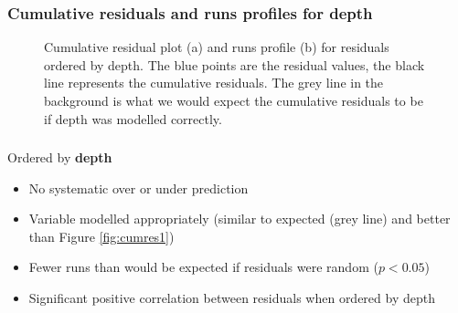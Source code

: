 \begin{frame}[fragile]
\frametitle{Cumulative residuals and runs profiles for depth}
\begin{figure}[h]
  \centering
{}
    \caption{Cumulative residual plot (a) and runs profile (b) for residuals ordered by depth. The blue points are the residual values, the black line represents the cumulative residuals. The grey line in the background is what we would expect the cumulative residuals to be if depth was modelled correctly.}
  \label{fig:geeruns1}
\end{figure}
\end{frame}

\begin{frame}[fragile]
\frametitle{}
Ordered by \textbf{depth}
\begin{itemize}
\item No systematic over or under prediction
\item Variable modelled appropriately (similar to expected (grey line) and better than Figure \ref{fig:cumres1})
\item Fewer runs than would be expected if residuals were random ($p<0.05$)
\item Significant positive correlation between residuals when ordered by depth
\end{itemize}
\end{frame}

